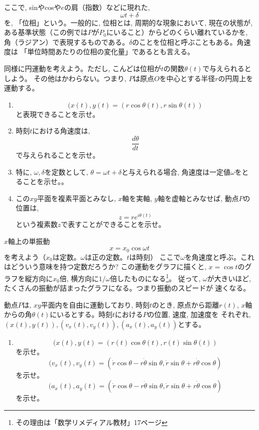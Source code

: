 \begin{faq}
{{ここで, sinやcosや$e$の肩（指数）などに現れた, 
\[\omega t+\delta\]
を, 「位相」という。一般的に, 位相とは, 周期的な現象において, 現在の状態が, 
ある基準状態（この例では$P$が$P_0$にいること）からどのくらい離れているかを, 
角（ラジアン）で表現するものである。$\delta$のことを位相と呼ぶこともある。角速度は
「単位時間あたりの位相の変化量」であるとも言える。
\vspace{0.3cm}

\item 同様に円運動を考えよう。ただし, こんどは位相が$t$の関数$\theta(t)$で与えられるとしよう。
その他はかわらない。つまり, $P$は原点$O$を中心とする半径$r$の円周上を運動する。
\begin{enumerate}
\item
\[(x(t), y(t)=(r\cos \theta(t), r\sin \theta(t))\]
と表現できることを示せ。
\item 時刻$t$における角速度は, 
\[\frac{d\theta}{dt}\]
で与えられることを示せ。
\item 特に, $\omega, \delta$を定数として, $\theta=\omega t+\delta$と与えられる場合, 
角速度は一定値$\omega$をとることを示せ。。
\item この$xy$平面を複素平面とみなし, $x$軸を実軸, $y$軸を虚軸とみなせば, 動点$P$の位置は, 
\[z=re^{i\theta(t)}\]
という複素数$z$で表すことができることを示せ。
\end{enumerate}
\vspace{0.3cm}



$x$軸上の単振動
\[x=x_0\cos\omega t\]
を考えよう（$x_0$は定数。$\omega$は正の定数。$t$は時刻）
ここで$\omega$を角速度と呼ぶ。これはどういう意味を持つ定数だろうか? 
この運動をグラフに描くと, $x=\cos t$のグラフを縦方向に$x_0$倍, 
横方向に$1/\omega$倍したものになる\footnote{その理由は「数学リメディアル教材」17ページ}。
従って, $\omega$が大きいほど, たくさんの振動が詰まったグラフになる。つまり振動のスピードが
速くなる。





\item 動点$P$は, $xy$平面内を自由に運動しており, 時刻$t$のとき, 
原点から距離$r(t)$, $x$軸からの角$\theta(t)$にいるとする。時刻$t$における$P$の位置, 速度, 加速度を
それぞれ, $(x(t), y(t)), (v_x(t), v_y(t)), (a_x(t), a_y(t))$とする。
\begin{enumerate}
\item
\[(x(t), y(t)=(r(t)\cos \theta(t), r(t)\sin \theta(t))\]
を示せ。
\[(v_x(t), v_y(t)=(\dot r \cos \theta-r\dot\theta\sin\theta, \dot r \sin \theta+r\dot\theta\cos\theta)\]
を示せ。
\[(a_x(t), a_y(t)=(\dot r \cos \theta-r\dot\theta\sin\theta, \dot r \sin \theta+r\dot\theta\cos\theta)\]
を示せ。



\end{enumerate}}}
\end{faq}
